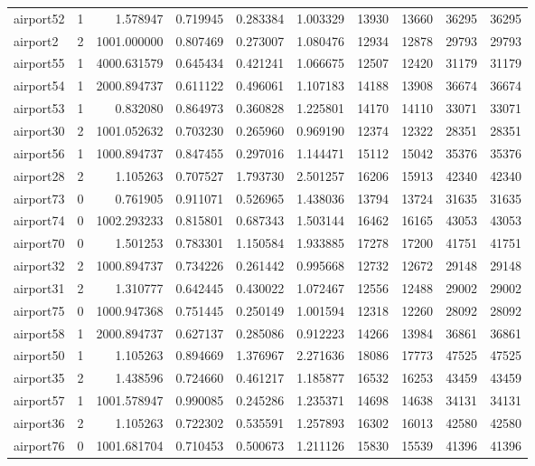 \begin{longtable}{|l|r|r|r|r|r|r|r|r|r|}
airport52 & 1 & 1.578947 & 0.719945 & 0.283384 & 1.003329 & 13930 & 13660 & 36295 & 36295 \\
airport2 & 2 & 1001.000000 & 0.807469 & 0.273007 & 1.080476 & 12934 & 12878 & 29793 & 29793 \\
airport55 & 1 & 4000.631579 & 0.645434 & 0.421241 & 1.066675 & 12507 & 12420 & 31179 & 31179 \\
airport54 & 1 & 2000.894737 & 0.611122 & 0.496061 & 1.107183 & 14188 & 13908 & 36674 & 36674 \\
airport53 & 1 & 0.832080 & 0.864973 & 0.360828 & 1.225801 & 14170 & 14110 & 33071 & 33071 \\
airport30 & 2 & 1001.052632 & 0.703230 & 0.265960 & 0.969190 & 12374 & 12322 & 28351 & 28351 \\
airport56 & 1 & 1000.894737 & 0.847455 & 0.297016 & 1.144471 & 15112 & 15042 & 35376 & 35376 \\
airport28 & 2 & 1.105263 & 0.707527 & 1.793730 & 2.501257 & 16206 & 15913 & 42340 & 42340 \\
airport73 & 0 & 0.761905 & 0.911071 & 0.526965 & 1.438036 & 13794 & 13724 & 31635 & 31635 \\
airport74 & 0 & 1002.293233 & 0.815801 & 0.687343 & 1.503144 & 16462 & 16165 & 43053 & 43053 \\
airport70 & 0 & 1.501253 & 0.783301 & 1.150584 & 1.933885 & 17278 & 17200 & 41751 & 41751 \\
airport32 & 2 & 1000.894737 & 0.734226 & 0.261442 & 0.995668 & 12732 & 12672 & 29148 & 29148 \\
airport31 & 2 & 1.310777 & 0.642445 & 0.430022 & 1.072467 & 12556 & 12488 & 29002 & 29002 \\
airport75 & 0 & 1000.947368 & 0.751445 & 0.250149 & 1.001594 & 12318 & 12260 & 28092 & 28092 \\
airport58 & 1 & 2000.894737 & 0.627137 & 0.285086 & 0.912223 & 14266 & 13984 & 36861 & 36861 \\
airport50 & 1 & 1.105263 & 0.894669 & 1.376967 & 2.271636 & 18086 & 17773 & 47525 & 47525 \\
airport35 & 2 & 1.438596 & 0.724660 & 0.461217 & 1.185877 & 16532 & 16253 & 43459 & 43459 \\
airport57 & 1 & 1001.578947 & 0.990085 & 0.245286 & 1.235371 & 14698 & 14638 & 34131 & 34131 \\
airport36 & 2 & 1.105263 & 0.722302 & 0.535591 & 1.257893 & 16302 & 16013 & 42580 & 42580 \\
airport76 & 0 & 1001.681704 & 0.710453 & 0.500673 & 1.211126 & 15830 & 15539 & 41396 & 41396 \\

\end{longtable}
